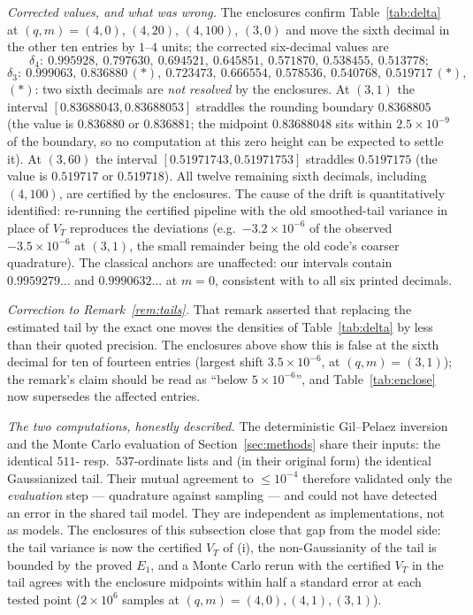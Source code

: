 \emph{Corrected values, and what was wrong.} The enclosures confirm
Table~\ref{tab:delta} at $(q,m)=(4,0)$, $(4,20)$, $(4,100)$, $(3,0)$
and move the sixth decimal in the other ten entries by $1$--$4$ units;
the corrected six-decimal values are
\[
\delta_4:\ 0.995928,\ 0.797630,\ 0.694521,\ 0.645851,\ 0.571870,\
0.538455,\ 0.513778;
\]
\[
\delta_3:\ 0.999063,\ 0.836880\,(*),\ 0.723473,\ 0.666554,\ 0.578536,\
0.540768,\ 0.519717\,(*),
\]
$(*)$: two sixth decimals are \emph{not resolved} by the enclosures.
At $(3,1)$ the interval $[0.83688043,0.83688053]$ straddles the
rounding boundary $0.8368805$ (the value is $0.836880$ or $0.836881$;
the midpoint $0.83688048$ sits within $2.5\times10^{-9}$ of the
boundary, so no computation at this zero height can be expected to
settle it). At $(3,60)$ the interval $[0.51971743,0.51971753]$
straddles $0.5197175$ (the value is $0.519717$ or $0.519718$). All
twelve remaining sixth decimals, including $(4,100)$, are certified by
the enclosures. The cause of the drift is
quantitatively identified: re-running the certified pipeline with the
old smoothed-tail variance in place of $V_T$ reproduces the deviations
(e.g.\ $-3.2\times10^{-6}$ of the observed $-3.5\times10^{-6}$ at
$(3,1)$, the small remainder being the old code's coarser quadrature).
The classical anchors are unaffected: our intervals contain
$0.9959279\ldots$ and $0.9990632\ldots$ at $m=0$, consistent with
\cite{RS94,FM13} to all six printed decimals.

\emph{Correction to Remark~\ref{rem:tails}.} That remark asserted that
replacing the estimated tail by the exact one moves the densities of
Table~\ref{tab:delta} by less than their quoted precision. The
enclosures above show this is false at the sixth decimal for ten of
fourteen entries (largest shift $3.5\times10^{-6}$, at $(q,m)=(3,1)$);
the remark's claim should be read as ``below $5\times10^{-6}$'', and
Table~\ref{tab:enclose} now supersedes the affected entries.

\emph{The two computations, honestly described.} The deterministic
Gil--Pelaez inversion and the Monte Carlo evaluation of
Section~\ref{sec:methods} share their inputs: the identical
$511$- resp.\ $537$-ordinate lists and (in their original form) the
identical Gaussianized tail. Their mutual agreement to
$\le10^{-4}$ therefore validated only the \emph{evaluation} step ---
quadrature against sampling --- and could not have detected an error in
the shared tail model. They are independent as implementations, not as
models. The enclosures of this subsection close that gap from the model
side: the tail variance is now the certified $V_T$ of (i), the
non-Gaussianity of the tail is bounded by the proved $E_1$, and a
Monte Carlo rerun with the certified $V_T$ in the tail agrees with the
enclosure midpoints within half a standard error at each tested point
($2\times10^6$ samples at $(q,m)=(4,0),(4,1),(3,1)$).

